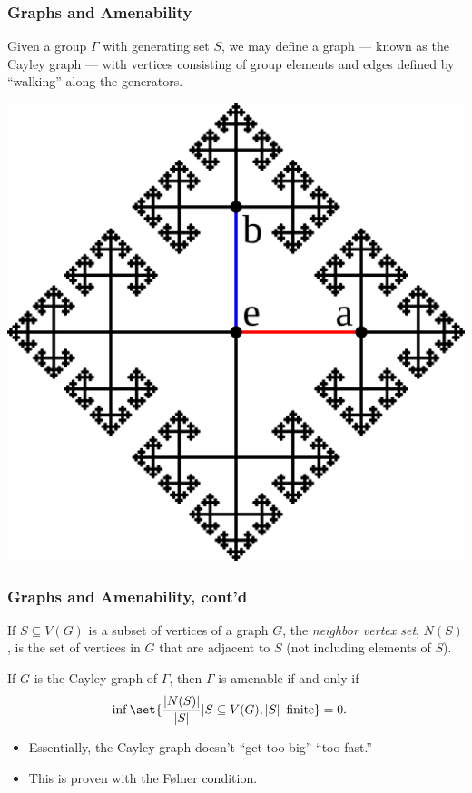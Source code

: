 \documentclass{beamer-custom}
\begin{document}
\begin{frame}
  \frametitle{Graphs and Amenability}
  Given a group $\Gamma$ with generating set $S$, we may define a graph --- known as the Cayley graph --- with vertices consisting of group elements and edges defined by ``walking'' along the generators.\pause
  \begin{center}
    \includegraphics[scale=0.06]{images/cayley_graph.png}
  \end{center}
\end{frame}
\begin{frame}
  \frametitle{Graphs and Amenability, cont'd}
  If $S\subseteq V(G)$ is a subset of vertices of a graph $G$, the \textit{neighbor vertex set}, $N(S)$, is the set of vertices in $G$ that are adjacent to $S$ (not including elements of $S$).\pause\newline

  If $G$ is the Cayley graph of $\Gamma$, then $\Gamma$ is amenable if and only if
  \begin{align*}
    \inf\set{\frac{\left\vert N(S) \right\vert}{\left\vert S \right\vert} | S\subseteq V(G),\left\vert S \right\vert\text{ finite}} &= 0.
  \end{align*}\pause
  \begin{itemize}
    \item Essentially, the Cayley graph doesn't ``get too big'' ``too fast.''\pause
    \item This is proven with the Følner condition.
  \end{itemize}
\end{frame}
\end{document}
